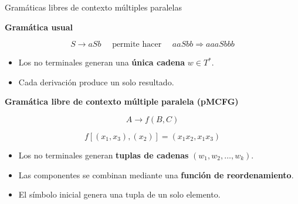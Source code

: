 \documentclass{beamer}
\begin{document}
\begin{frame}{Gramáticas libres de contexto múltiples paralelas}

    \pause

    \textbf{Gramática usual}

    \vspace{0.2cm}

    \[
        S \rightarrow aSb \quad \text{ permite hacer }\quad aaSbb \Rightarrow aaaSbbb
    \]

    \pause

    \begin{itemize}
        \item Los no terminales generan una \textbf{única cadena} $w \in T^*$.
        \item Cada derivación produce un solo resultado.
    \end{itemize}

    \vspace{0.5cm}

    \pause

    \textbf{Gramática libre de contexto múltiple paralela (pMCFG)}

    \[
        A \rightarrow f(B, C)
    \]

    \pause

    \[
        f[(x_1, x_3), (x_2)] = (x_1 x_2, x_1 x_3)
    \]

    \pause

    \begin{itemize}
        \item Los no terminales generan \textbf{tuplas de cadenas} $(w_1, w_2, \dots, w_k)$.
        \item Las componentes se combinan mediante una \textbf{función de reordenamiento}.
        \item El símbolo inicial genera una tupla de un solo elemento.
    \end{itemize}

\end{frame}
\end{document}
